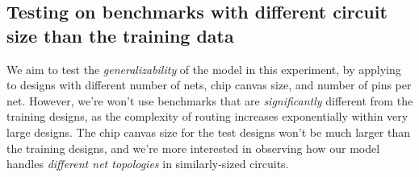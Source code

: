 \documentclass[letterpaper]{article}
\begin{document}
\subsection{Testing on benchmarks with different circuit size than the training data}

We aim to test the {\it generalizability} of the model in this experiment, by applying to designs with different number of nets, chip canvas size, and number of pins per net. However, we're won't use benchmarks that are {\it significantly} different from the training designs, as the complexity of routing increases exponentially within very large designs. The chip canvas size for the test designs won't be much larger than the training designs, and we're more interested in observing how our model handles {\it different net topologies} in similarly-sized circuits.
    
    
    
{
\small


}

\end{document}
